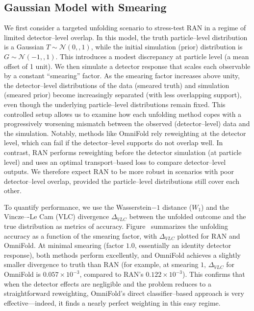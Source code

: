     \subsection{Gaussian Model with Smearing}
        We first consider a targeted unfolding scenario to stress-test RAN in a regime of limited detector--level overlap.
        In this model, the truth particle--level distribution is a Gaussian $T \sim \mathcal{N}(0,,1)$, while the initial simulation (prior) distribution is $G \sim \mathcal{N}(-1,,1)$.
        This introduces a modest discrepancy at particle level (a mean offset of 1 unit).
        We then simulate a detector response that scales each observable by a constant “smearing” factor.
        As the smearing factor increases above unity, the detector--level distributions of the data (smeared truth) and simulation (smeared prior) become increasingly separated (with less overlapping support), even though the underlying particle--level distributions remain fixed.
        This controlled setup allows us to examine how each unfolding method copes with a progressively worsening mismatch between the observed (detector--level) data and the simulation.
        Notably, methods like OmniFold rely reweighting at the detector level, which can fail if the detector--level supports do not overlap well.
        In contrast, RAN performs reweighting before the detector simulation (at particle level) and uses an optimal transport--based loss to compare detector--level outputs.
        We therefore expect RAN to be more robust in scenarios with poor detector--level overlap, provided the particle--level distributions still cover each other.

        To quantify performance, we use the Wasserstein\(-1\) distance ($W_1$) and the Vincze–-Le Cam (VLC) divergence $\Delta_{VLC}$ between the unfolded outcome and the true distribution as metrics of accuracy.
        Figure~ summarizes the unfolding accuracy as a function of the smearing factor, with $\Delta_{VLC}$ plotted for RAN and OmniFold.
        At minimal smearing (factor $1.0$, essentially an identity detector response), both methods perform excellently, and OmniFold achieves a slightly smaller divergence to truth than RAN (for example, at smearing $1$, $\Delta_{VLC}$ for OmniFold is $0.057\times10^{-3}$, compared to RAN’s $0.122\times10^{-3}$).
        This confirms that when the detector effects are negligible and the problem reduces to a straightforward reweighting, OmniFold’s direct classifier--based approach is very effective---indeed, it finds a nearly perfect weighting in this easy regime.

